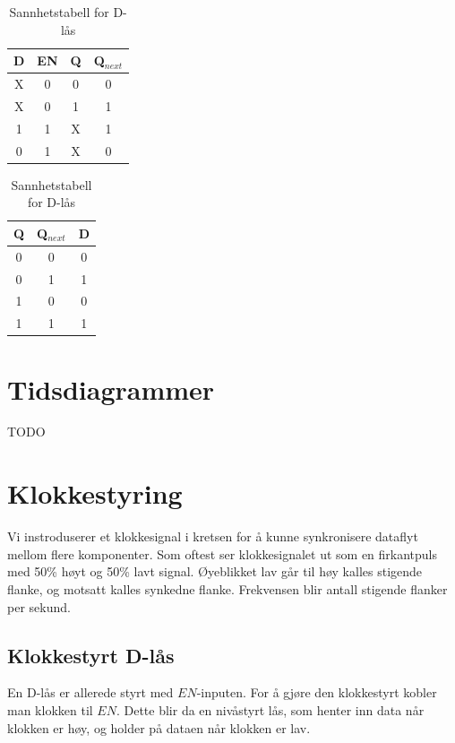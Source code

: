 \documentclass[12pt,a4paper,norsk]{article}
\begin{document}
\begin{table}[hbt!]
  \centering
  \begin{minipage}{.45\textwidth}
    \centering
    \begin{tabular}{ccc|c}
      \toprule
      D & EN & Q & Q$_{next}$\\
      \midrule
      X & 0 & 0 & 0 \\
      X & 0 & 1 & 1 \\
      1 & 1 & X & 1 \\
      0 & 1 & X & 0 \\
      \bottomrule
    \end{tabular}
    \caption{Sannhetstabell for D-lås\label{tab:D-latch}}
  \end{minipage}\hfill
  \begin{minipage}{.45\textwidth}
    \centering
    \begin{tabular}{cc|c}
      \toprule
      Q & Q$_{next}$ & D \\
      \midrule
      0 & 0 & 0 \\
      \midrule
      0 & 1 & 1 \\
      \midrule
      1 & 0 & 0 \\
      \midrule
      1 & 1 & 1 \\
      \bottomrule
    \end{tabular}
  \end{minipage}
\end{table}

\section{Tidsdiagrammer}
TODO

\section{Klokkestyring}
Vi instroduserer et klokkesignal i kretsen for å kunne synkronisere dataflyt
mellom flere komponenter. Som oftest ser klokkesignalet ut som en firkantpuls
med 50\% høyt og 50\% lavt signal. Øyeblikket lav går til høy kalles stigende
flanke, og motsatt kalles synkedne flanke. Frekvensen blir antall stigende
flanker per sekund.

\subsection{Klokkestyrt D-lås}
En D-lås er allerede styrt med $EN$-inputen. For å gjøre den klokkestyrt kobler
man klokken til $EN$. Dette blir da en nivåstyrt lås, som henter inn data når
klokken er høy, og holder på dataen når klokken er lav.
\end{document}
